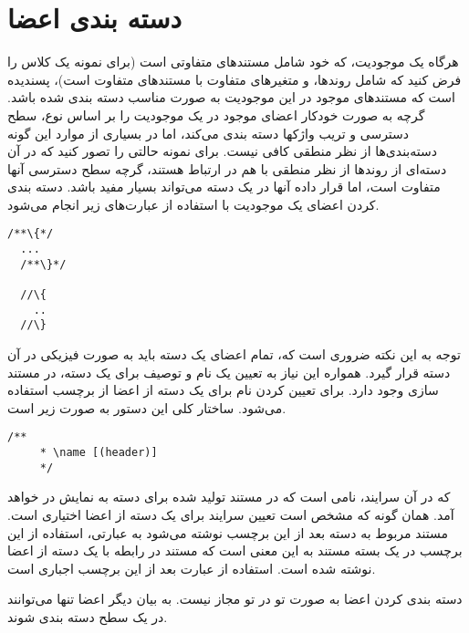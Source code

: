 
\section{دسته بندی اعضا}

هرگاه یک موجودیت، که خود شامل مستندهای متفاوتی است (برای نمونه یک کلاس را فرض
کنید که شامل روندها، و متغیرهای متفاوت با مستندهای متفاوت است)، پسندیده است که
مستندهای موجود در این موجودیت به صورت مناسب دسته بندی شده باشد. گرچه
 به صورت خودکار اعضای موجود در یک موجودیت را  بر اساس نوع، سطح
دسترسی  و تریب واژکها دسته بندی می‌کند، اما در بسیاری از موارد این گونه
دسته‌بندی‌ها از نظر منطقی کافی نیست. برای نمونه حالتی را تصور کنید که در آن
دسته‌ای از روندها از نظر منطقی با هم در ارتباط هستند، گرچه سطح دسترسی آنها
متفاوت است،  اما قرار داده آنها در یک دسته می‌تواند بسیار مفید باشد. دسته بندی
کردن اعضای یک موجودیت با استفاده از عبارت‌های زیر انجام می‌شود.
\begin{latin}
\lstset{language=C++}  
\begin{lstlisting}[frame=single] 
  /**\{*/
  ...
  /**\}*/
  
  //\{
    ..
  //\}
\end{lstlisting}
\end{latin}

توجه به این نکته ضروری است که، تمام اعضای یک دسته باید به صورت فیزیکی در آن دسته
قرار گیرد. همواره این نیاز  به تعیین یک نام  و توصیف برای یک دسته، در مستند سازی
وجود دارد. برای تعیین کردن نام برای یک دسته از اعضا از برچسب  استفاده
می‌شود. ساختار کلی این دستور به صورت زیر است.

\begin{latin}
\lstset{language=C++}  
\begin{lstlisting}[frame=single] 
    /**
     * \name [(header)]
     */
\end{lstlisting}
\end{latin}

که در آن سرایند، نامی است که در مستند تولید شده برای دسته به نمایش در خواهد آمد.
همان گونه که مشخص است تعیین سرایند برای یک دسته از اعضا اختیاری است. مستند مربوط
به دسته بعد از این برچسب نوشته می‌شود به عبارتی، استفاده از این برچسب در یک بسته
مستند به این معنی است که مستند در رابطه با یک دسته از اعضا نوشته شده است.
استفاده از عبارت \lr{ \\{ \\}} بعد از این برچسب اجباری است.

\begin{note}
دسته بندی کردن اعضا به صورت تو در تو مجاز نیست. به بیان دیگر اعضا تنها می‌توانند
در یک سطح دسته بندی شوند.
\end{note}

